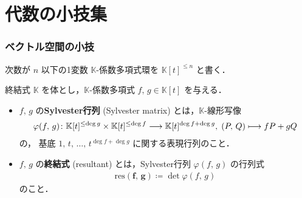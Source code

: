 \documentclass[TQFT_main]{subfiles}
\begin{document}
\chapter{代数の小技集}

\subsection{ベクトル空間の小技}

次数が $n$ 以下の1変数 $\mathbb{K}$-係数多項式環を $\mathbb{K}[t]^{\le n}$ と書く．

\begin{mydef}[label=def:resultant]{終結式}
    $\mathbb{K}$ を体とし，$\mathbb{K}$-係数多項式 $f,\, g \in \mathbb{K}[t]$ を与える．

    \begin{itemize}
        \item $f,\, g$ の\textbf{Sylvester行列} (Sylvester matrix) とは，$\mathbb{K}$-線形写像
        \begin{align}
            \varphi(f,\, g) \colon \mathbb{K}[t]^{\le \deg g} \times \mathbb{K}[t]^{\le \deg f} \longrightarrow \mathbb{K}[t]^{\deg f + \deg g},\; (P,\, Q) \longmapsto fP + gQ
        \end{align}
        の，
        基底 $1,\, t,\, \dots,\, t^{\deg f + \deg g}$
        に関する表現行列のこと．
        \item $f,\, g$ の\textbf{終結式} (resultant) とは，Sylvester行列 $\varphi(f,\, g)$ の行列式
        \begin{align}
            \bm{\mathrm{res}(f,\, g)} \coloneqq \det \varphi(f,\, g)
        \end{align}
        のこと．
    \end{itemize}
\end{mydef}
\end{document}
